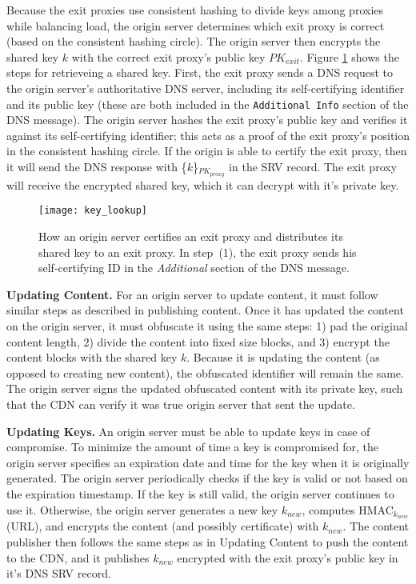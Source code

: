 Because the exit proxies use consistent hashing to divide keys among proxies while
balancing load, the origin server
determines which exit proxy is correct (based on the consistent hashing circle).  The origin server then encrypts the 
shared key $k$ with the correct exit proxy's public key $PK_{exit}$.  
Figure \ref{fig:keys} shows the steps for retrieveing a shared key.  First, the
exit proxy sends a DNS request to the origin server's authoritative DNS server, including its self-certifying
identifier and its public key (these are both included in the {\tt Additional Info} section of the DNS message).  The origin server hashes the exit 
proxy's public key and verifies it against its self-certifying identifier; this acts as a proof of the 
exit proxy's position in the consistent hashing circle.  If the origin is able to certify the exit proxy, then it will send the DNS response with 
\{$k$\}$_{PK_{proxy}}$ in the SRV record. The exit proxy will receive the encrypted shared key, which it can decrypt with it's private key.

\begin{figure}[t]
\centering
\texttt{[image: key\_lookup]}
\caption{How an origin server certifies an exit proxy and distributes its shared
key to an exit proxy.  In step~(1), 
the exit proxy sends his self-certifying ID in the {\it Additional} section of the DNS message.  }
\label{fig:keys}
\end{figure}

\textbf{Updating Content.}
For an origin server to update content, it must follow similar steps as described
in publishing content.  
Once it has updated the content on the origin server, it must obfuscate it using
the same steps: 1) pad the 
original content length, 2) divide the content into fixed size blocks, and 3) encrypt the content blocks 
with the shared key $k$.  Because it is updating the content (as opposed to creating
new content), the 
obfuscated identifier will remain the same.  The origin server signs the updated obfuscated content with 
its private key, such that the CDN can verify it was true origin server that sent
the update.

\textbf{Updating Keys.}
An origin server must be able to update keys in case of compromise.  To minimize the amount of time a key is compromised for, the 
origin server specifies an expiration date and time for the key when it is originally generated.  The origin server 
periodically checks if the key is valid or not based on the expiration timestamp.  If the key is still valid, the origin server 
continues to use it.  Otherwise, the origin server generates a new key $k_{new}$, computes HMAC$_{k_{new}}$(URL), and 
encrypts the content (and possibly certificate) with $k_{new}$.  The content publisher then follows the same steps as in Updating 
Content to push the content to the CDN, and it publishes $k_{new}$ encrypted with the exit proxy's public key in it's DNS SRV record.

